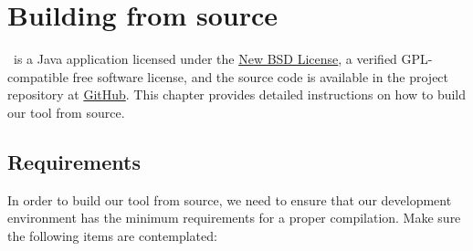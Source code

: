 \chapter{Building from source}
\label{chap:buildingfromsource}

\arara\ is a Java application licensed under the \href{http://www.opensource.org/licenses/bsd-license.php}{New BSD License}, a verified GPL-compatible free software license, and the source code is available in the project repository at \href{https://github.com/cereda/arara}{GitHub}. This chapter provides detailed instructions on how to build our tool from source.

\section{Requirements}
\label{sec:requirements}

In order to build our tool from source, we need to ensure that our development environment has the minimum requirements for a proper compilation. Make sure the following items are contemplated:

